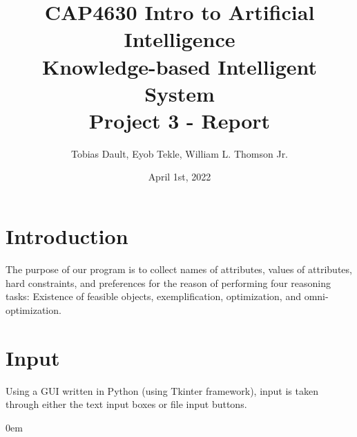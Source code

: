 \documentclass[12pt]{report}
\title{\textbf{CAP4630 Intro to Artificial Intelligence \\ Knowledge-based
Intelligent System \\ Project 3 - Report}}
\author{Tobias Dault, Eyob Tekle, William L. Thomson Jr.}
\date{April 1st, 2022}
\begin{document}
\maketitle
\tableofcontents
\thispagestyle{empty}

\chapter{Introduction}
The purpose of our program is to collect names of attributes, values of attributes, hard constraints, and preferences for the reason of performing four reasoning tasks: Existence of feasible objects, exemplification, optimization, and omni-optimization.
\newpage

\chapter{Input}
Using a GUI written in Python (using Tkinter framework), input is taken through either the text input boxes or file input buttons.

\addtolength{\itemindent}{0.80cm}
\itemsep0em
\end{document}
